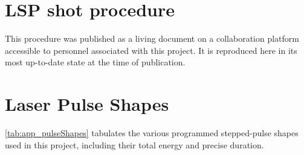 \documentclass[11pt,a4paper]{report}
\begin{document}
    \chapter{LSP shot procedure}
        This procedure was published as a living document on a collaboration platform accessible to personnel associated with this project. It is reproduced here in its most up-to-date state at the time of publication.

        
    \chapter{Laser Pulse Shapes} \label{chp:app_pulseShapes}
        \autoref{tab:app_pulseShapes} tabulates the various programmed stepped-pulse shapes used in this project, including their total energy and precise duration.
        
\end{document}
